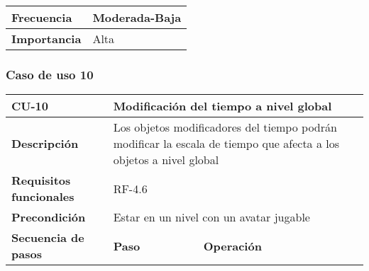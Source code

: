 \begin{longtable}{lll}
\textbf{Frecuencia}                              & \multicolumn{2}{l}{Moderada-Baja}                                                                                                                            \\ \hline
\textbf{Importancia}                             & \multicolumn{2}{l}{Alta}                                                                                                                                     \\ \hline
\end{longtable}

\subsubsection{Caso de uso 10}
\begin{longtable}{lll}
\textbf{CU-10}                                   & \multicolumn{2}{l}{Modificación del tiempo a nivel global}                                                                                                                                                                                                                       \\ \hline
\endfirsthead
%
\endhead
%
\textbf{Descripción}                             & \multicolumn{2}{l}{Los objetos modificadores del tiempo podrán modificar la escala de tiempo que afecta a los objetos a nivel global}                                                                                                                                            \\ \hline
\textbf{Requisitos funcionales}                  & \multicolumn{2}{l}{RF-4.6}                                                                                                                                                                                                                                                       \\ \hline
\textbf{Precondición}                            & \multicolumn{2}{l}{Estar en un nivel con un avatar jugable}                                                                                                                                                                                                                      \\ \hline
\multicolumn{1}{l|}{\textbf{Secuencia de pasos}} & \textbf{Paso}                                                                                  & \textbf{Operación}                                                                                                                                                              \\ \cline{2-3} 

\end{longtable}
